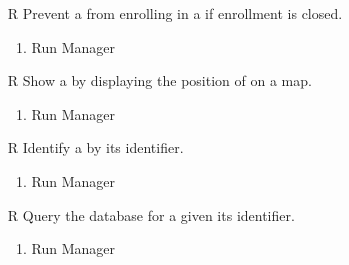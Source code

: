 \begin{itemize}
	\item[R\subs{47}]Prevent a  from enrolling in a  if enrollment is closed.
	\begin{enumerate}
		\item Run Manager
	\end{enumerate}
	\item[R\subs{48}]Show a  by displaying the position of  on a map.
	\begin{enumerate}
		\item Run Manager
	\end{enumerate}
	\item[R\subs{49}]Identify a  by its identifier.
	\begin{enumerate}
		\item Run Manager
	\end{enumerate}
	\item[R\subs{50}]Query the database for a  given its identifier.
	\begin{enumerate}
		\item Run Manager
	\end{enumerate}
\end{itemize}


\thispagestyle{fancy}

